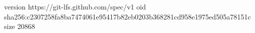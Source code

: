 version https://git-lfs.github.com/spec/v1
oid sha256:c2307258fa8ba7474061e95417b82eb0203b368281cd958e1975ed505a78151c
size 20868
